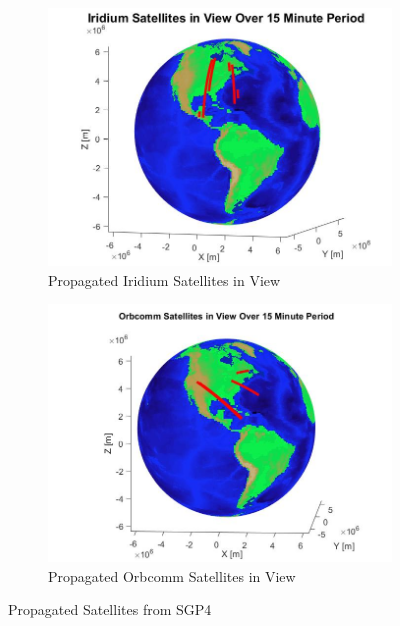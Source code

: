 \documentclass[12pt]{report}
\begin{document}
\begin{figure}[ht]
    \centering
    \begin{subfigure}{.4\textwidth}
        \centering
        \includegraphics[width=\textwidth]{Iridium_sats_over_auburn.jpg}
        \caption{Propagated Iridium Satellites in View}
        \label{fig:IridSatsOverAub}
    \end{subfigure} %
    \begin{subfigure}{.42\textwidth}
        \centering
        \includegraphics[width=\textwidth]{Orbcomm_sats_over_auburn.jpg}
        \caption{Propagated Orbcomm Satellites in View}
        \label{fig:OrbSatOverAub}
    \end{subfigure}
    \caption{Propagated Satellites from SGP4}
    \label{fig:bothpropsats}
\end{figure}
\end{document}
